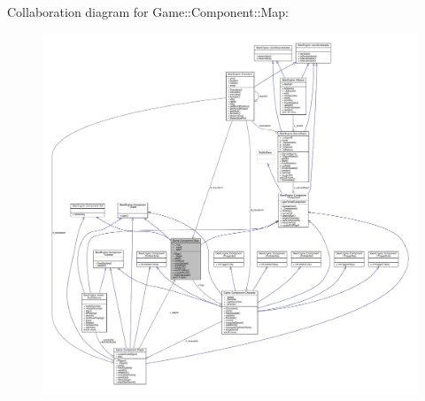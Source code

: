 Collaboration diagram for Game\+:\+:Component\+:\+:Map\+:
\nopagebreak
\begin{figure}[H]
\begin{center}
\leavevmode
\includegraphics[width=350pt]{class_game_1_1_component_1_1_map__coll__graph}
\end{center}
\end{figure}
